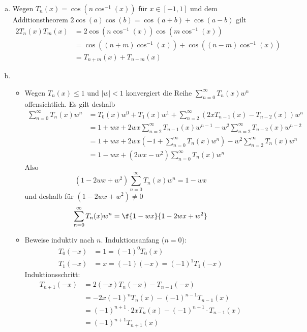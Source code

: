 \documentclass{mywork}
\begin{document}
\begin{aufgabe}
	\begin{enumerate}[a)]
		\item		
			Wegen $T_n(x) = \cos(n\cos^{-1}(x))$ für $x\in [-1,1]$ und dem Additionstheorem $2\cos(a)\cos(b) = \cos(a+b) + \cos(a-b)$ gilt
			\begin{align*}
				2 T_n(x) T_m(x) &= 2\cos(n\cos^{-1}(x)) \cos(m\cos^{-1}(x))\\
				&=\cos((n+m)\cos^{-1}(x)) + \cos((n-m)\cos^{-1}(x))\\
				&= T_{n+m}(x) + T_{n-m}(x)
			\end{align*}
		\item
			\begin{itemize}
				\item
					Wegen $T_n(x) \le 1$ und $|w|<1$ konvergiert die Reihe $\sum_{n=0}^\infty T_n(x)w^n$ offensichtlich.
					Es gilt deshalb
					\begin{align*}
						\sum_{n=0}^\infty T_n(x)w^n
						&= T_0(x)w^0 + T_1(x)w^1 + \sum_{n=2}^\infty (2xT_{n-1}(x) - T_{n-2}(x))w^n\\
						&= 1 + wx + 2wx \sum_{n=2}^\infty T_{n-1}(x)w^{n-1} - w^2 \sum_{n=2}^\infty T_{n-2}(x) w^{n-2}\\
						&= 1 + wx + 2wx\left( - 1 + \sum_{n=0}^\infty T_n(x)w^n\right) - w^2 \sum_{n=2}^\infty T_n(x)w^n\\
						&= 1 - wx + (2wx - w^2) \sum_{n=0}^\infty T_n(x) w^n
					\end{align*}
					Also
					\[
						(1-2wx +w^2)\sum_{n=0}^\infty T_n(x)w^n = 1-wx
					\]
					und deshalb für $(1-2wx+w^2)\neq 0$
					\[
						\sum_{n=0}^\infty T_n(x) w^n = \f {1-wx}{1-2wx +w^2}
					\]
				\item
					Beweise induktiv nach $n$.
					Induktionsanfang ($n=0$):
					\begin{align*}
						T_0(-x) &= 1 = (-1)^0T_0(x)\\
						T_1(-x) &= x = (-1)(-x) = (-1)^1T_1(-x)
					\end{align*}
					Induktionsschritt:
					\begin{align*}
						T_{n+1}(-x) &= 2(-x)T_{n}(-x) - T_{n-1}(-x) \\
						&= -2x(-1)^nT_n(x) - (-1)^{n-1}T_{n-1}(x) \\
						&= (-1)^{n+1}\cdot 2xT_n(x) - (-1)^{n+1}\cdot T_{n-1}(x) \\
						&= (-1)^{n+1}T_{n+1}(x)
					\end{align*}
			\end{itemize}
	\end{enumerate}
\end{aufgabe}
\end{document}
